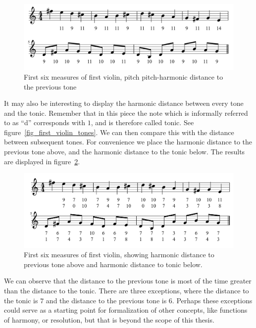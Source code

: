 \documentclass[a4paper]{book}
\theoremstyle{definition}
\begin{document}
\begin{figure}[H]
    \centering
    \includegraphics[scale=0.25]{figures/fig_first_violin_melodic_harmonic_distance.png}
    \caption{First six measures of first violin, pitch pitch-harmonic distance to the previous tone}
    \label{fig_first_violin_melodic_harmonic_distance}
\end{figure}

It may also be interesting to display the harmonic distance between every tone and the tonic.
Remember that in this piece the note which is informally referred to as ``d'' corresponds with $1$, and is therefore called tonic.
See figure~\ref{fig_first_violin_tones}.
We can then compare this with the distance between subsequent tones.
For convenience we place the harmonic distance to the previous tone above, and the harmonic distance to the tonic below.
The results are displayed in figure~\ref{fig_first_violin_harmonic_distance_to_tonic}.

\begin{figure}[H]
    \centering
    \includegraphics[scale=0.25]{figures/fig_first_violin_harmonic_distance_to_tonic.png}
    \caption{First six measures of first violin, showing harmonic distance to previous tone above and harmonic distance to tonic below.}
    \label{fig_first_violin_harmonic_distance_to_tonic}
\end{figure}

We can observe that the distance to the previous tone is most of the time greater than the distance to the tonic.
There are three exceptions, where the distance to the tonic is $7$ and the distance to the previous tone is $6$.
Perhaps these exceptions could serve as a starting point for formalization of other concepts, like functions of harmony, or resolution, but that is beyond the scope of this thesis.
\end{document}

